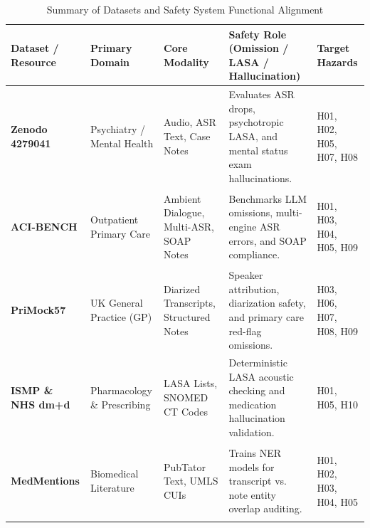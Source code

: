 \begin{table}[htbp]
\centering
\small
\caption{Summary of Datasets and Safety System Functional Alignment}
\label{tab:dataset\_summary}
\renewcommand{\arraystretch}{1.25}
\begin{tabularx}{\linewidth}{>{\bfseries}p{2.8cm} >{\raggedright\arraybackslash}p{2.2cm} >{\raggedright\arraybackslash}p{2.4cm} >{\raggedright\arraybackslash}X >{\bfseries\raggedright\arraybackslash}p{1.8cm}}
\toprule
Dataset / Resource & Primary Domain & Core Modality & Safety Role (Omission / LASA / Hallucination) & Target Hazards \\
\midrule

Zenodo 4279041 & Psychiatry / Mental Health & Audio, ASR Text, Case Notes & Evaluates ASR drops, psychotropic LASA, and mental status exam hallucinations. & H01, H02, H05, H07, H08 \\
\rowcolor{gray!10}
ACI-BENCH & Outpatient Primary Care & Ambient Dialogue, Multi-ASR, SOAP Notes & Benchmarks LLM omissions, multi-engine ASR errors, and SOAP compliance. & H01, H03, H04, H05, H09 \\

PriMock57 & UK General Practice (GP) & Diarized Transcripts, Structured Notes & Speaker attribution, diarization safety, and primary care red-flag omissions. & H03, H06, H07, H08, H09 \\
\rowcolor{gray!10}
ISMP \& NHS dm+d & Pharmacology \& Prescribing & LASA Lists, SNOMED CT Codes & Deterministic LASA acoustic checking and medication hallucination validation. & H01, H05, H10 \\

MedMentions & Biomedical Literature & PubTator Text, UMLS CUIs & Trains NER models for transcript vs. note entity overlap auditing. & H01, H02, H03, H04, H05 \\
\bottomrule
\end{tabularx}
\end{table}
